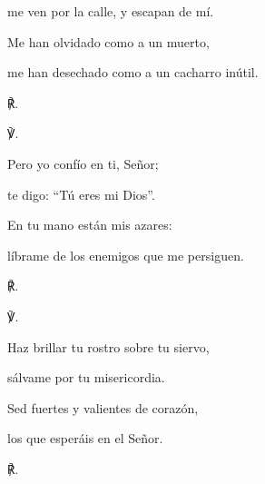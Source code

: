 			\begin{readtabbed}me ven por la calle, y escapan de mí. \end{readtabbed}
			
			\begin{readtabbed}Me han olvidado como a un muerto, \end{readtabbed}
			
			\begin{readtabbed}me han desechado como a un cacharro inútil. \begin{readred}℟.\end{readred}\end{readtabbed}
			
			\begin{readps}\begin{readred}℣.\end{readred} Pero yo confío en ti, Señor; \end{readps}
			
			\begin{readtabbed}te digo: “Tú eres mi Dios”. \end{readtabbed}
			
			\begin{readtabbed}En tu mano están mis azares: \end{readtabbed}
			
			\begin{readtabbed}líbrame de los enemigos que me persiguen. \begin{readred}℟.\end{readred}\end{readtabbed}
			
			\begin{readps}\begin{readred}℣.\end{readred} Haz brillar tu rostro sobre tu siervo, \end{readps}
			
			\begin{readtabbed}sálvame por tu misericordia. \end{readtabbed}
			
			\begin{readtabbed}Sed fuertes y valientes de corazón, \end{readtabbed}
			
			\begin{readtabbed}los que esperáis en el Señor. \begin{readred}℟.\end{readred}\end{readtabbed}
			
